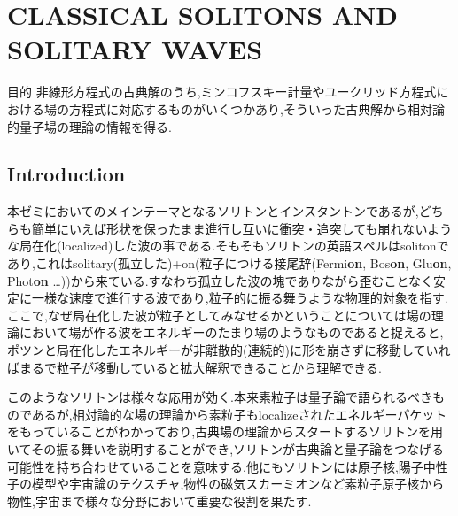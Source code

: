 \documentclass[dvipdfmx,11pt,a4paper]{jsbook}
\begin{document}


\makeatletter
{}
\def\theequation{\thesection.\arabic{equation}}
\makeatother

\addtolength{\fullwidth}{-26truemm} %
\setlength{\textwidth}{\fullwidth}  %
\setlength{\evensidemargin}{10truemm}   %
\setlength{\oddsidemargin}{10truemm}    %

\chapter{CLASSICAL SOLITONS AND SOLITARY WAVES}
\begin{itembox}[l]{目的}
    非線形方程式の古典解のうち,ミンコフスキー計量やユークリッド方程式における場の方程式に対応するものがいくつかあり,そういった古典解から相対論的量子場の理論の情報を得る.
\end{itembox}

\section{Introduction}

本ゼミにおいてのメインテーマとなるソリトンとインスタントンであるが,どちらも簡単にいえば形状を保ったまま進行し互いに衝突・追突しても崩れないような局在化(localized)した波の事である.そもそもソリトンの英語スペルはsolitonであり,これはsolitary(孤立した)+on(粒子につける接尾辞(Fermi{\bf on}, Bos{\bf on}, Glu{\bf on}, Phot{\bf on} \dots))から来ている.すなわち孤立した波の塊でありながら歪むことなく安定に一様な速度で進行する波であり,粒子的に振る舞うような物理的対象を指す.ここで,なぜ局在化した波が粒子としてみなせるかということについては場の理論において場が作る波をエネルギーのたまり場のようなものであると捉えると,ポツンと局在化したエネルギーが非離散的(連続的)に形を崩さずに移動していればまるで粒子が移動していると拡大解釈できることから理解できる.

このようなソリトンは様々な応用が効く.本来素粒子は量子論で語られるべきものであるが,相対論的な場の理論から素粒子もlocalizeされたエネルギーパケットをもっていることがわかっており,古典場の理論からスタートするソリトンを用いてその振る舞いを説明することができ,ソリトンが古典論と量子論をつなげる可能性を持ち合わせていることを意味する.他にもソリトンには原子核,陽子中性子の模型や宇宙論のテクスチャ,物性の磁気スカーミオンなど素粒子原子核から物性,宇宙まで様々な分野において重要な役割を果たす.
\end{document}
